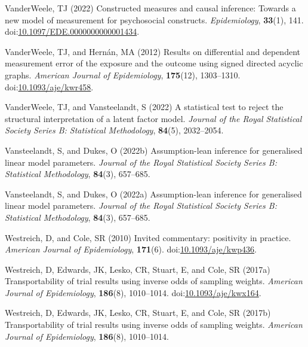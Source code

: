 \documentclass[
  single column]{article}
\newlength{\cslhangindent}
\newenvironment{CSLReferences}[2] %
 {\begin{list}{}{%
  \setlength{\itemindent}{0pt}
  \setlength{\leftmargin}{0pt}
  \setlength{\parsep}{0pt}
  \ifodd #1
   \setlength{\leftmargin}{\cslhangindent}
   \setlength{\itemindent}{-1\cslhangindent}
  \fi
  \setlength{\itemsep}{#2\baselineskip}}}
 {\end{list}}
\begin{document}
\begin{CSLReferences}{1}{0}
VanderWeele, TJ (2022) Constructed measures and causal inference:
Towards a new model of measurement for psychosocial constructs.
\emph{Epidemiology}, \textbf{33}(1), 141.
doi:\href{https://doi.org/10.1097/EDE.0000000000001434}{10.1097/EDE.0000000000001434}.

VanderWeele, TJ, and Hernán, MA (2012) Results on differential and
dependent measurement error of the exposure and the outcome using signed
directed acyclic graphs. \emph{American Journal of Epidemiology},
\textbf{175}(12), 1303--1310.
doi:\href{https://doi.org/10.1093/aje/kwr458}{10.1093/aje/kwr458}.

VanderWeele, TJ, and Vansteelandt, S (2022) A statistical test to reject
the structural interpretation of a latent factor model. \emph{Journal of
the Royal Statistical Society Series B: Statistical Methodology},
\textbf{84}(5), 2032--2054.

Vansteelandt, S, and Dukes, O (2022b) Assumption-lean inference for
generalised linear model parameters. \emph{Journal of the Royal
Statistical Society Series B: Statistical Methodology}, \textbf{84}(3),
657--685.

Vansteelandt, S, and Dukes, O (2022a) Assumption-lean inference for
generalised linear model parameters. \emph{Journal of the Royal
Statistical Society Series B: Statistical Methodology}, \textbf{84}(3),
657--685.

Westreich, D, and Cole, SR (2010) Invited commentary: positivity in
practice. \emph{American Journal of Epidemiology}, \textbf{171}(6).
doi:\href{https://doi.org/10.1093/aje/kwp436}{10.1093/aje/kwp436}.

Westreich, D, Edwards, JK, Lesko, CR, Stuart, E, and Cole, SR (2017a)
Transportability of trial results using inverse odds of sampling
weights. \emph{American Journal of Epidemiology}, \textbf{186}(8),
1010--1014.
doi:\href{https://doi.org/10.1093/aje/kwx164}{10.1093/aje/kwx164}.

Westreich, D, Edwards, JK, Lesko, CR, Stuart, E, and Cole, SR (2017b)
Transportability of trial results using inverse odds of sampling
weights. \emph{American Journal of Epidemiology}, \textbf{186}(8),
1010--1014.

\end{CSLReferences}
\end{document}
